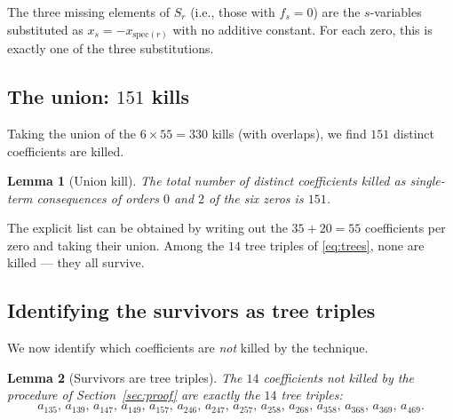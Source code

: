 \documentclass[11pt]{article}
\newcommand{\spec}{\mathrm{spec}}
\newtheorem{lemma}{Lemma}
\theoremstyle{definition}
\begin{document}
The three missing elements of $S_r$ (i.e., those with $f_s=0$) are the
$s$-variables substituted as $x_s = -x_{\spec(r)}$ with no additive constant.
For each zero, this is exactly one of the three substitutions.

\subsection{The union: $151$ kills}

Taking the union of the $6\times 55=330$ kills (with overlaps), we find
$151$ distinct coefficients are killed.

\begin{lemma}[Union kill]
\label{lem:union}
The total number of distinct coefficients killed as single-term consequences
of orders $0$ and $2$ of the six zeros is $151$.
\end{lemma}

The explicit list can be obtained by writing out the $35+20=55$ coefficients
per zero and taking their union. Among the $14$ tree triples of
\eqref{eq:trees}, none are killed --- they all survive.

\subsection{Identifying the survivors as tree triples}

We now identify which coefficients are \emph{not} killed by the technique.

\begin{lemma}[Survivors are tree triples]
\label{lem:survivors}
The $14$ coefficients not killed by the procedure of
Section~\ref{sec:proof} are exactly the $14$ tree triples:
\[
a_{135},\,a_{139},\,a_{147},\,a_{149},\,a_{157},\,
a_{246},\,a_{247},\,a_{257},\,a_{258},\,a_{268},\,
a_{358},\,a_{368},\,a_{369},\,a_{469}.
\]
\end{lemma}
\end{document}
